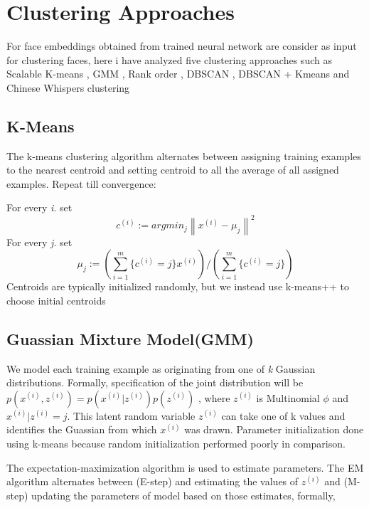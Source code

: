 \documentclass[a4paper,12pt, twoside]{NITKReport}
\begin{document}
\section{Clustering Approaches}
For face embeddings obtained from trained neural network are consider as input for clustering faces, here i have analyzed five clustering approaches such as Scalable K-means \cite{bahmani2012scalable}, GMM \cite{cui2007easyalbum}, Rank order \cite{ho2003clustering}, DBSCAN \cite{schroff2015facenet}, DBSCAN + Kmeans \cite{tian2007face} and Chinese Whispers clustering \cite{biemann2006chinese}

\subsection{K-Means}
\par The k-means clustering algorithm alternates between assigning training examples to the nearest centroid and setting centroid to all the average of all assigned examples. Repeat till convergence:

For every \textit{i}. set
\begin{equation}
c^{(i)} := argmin_{j}\left \| x^{(i)} - \mu _{j} \right \|^{2}
\end{equation}
For every \textit{j}. set
\begin{equation}
\mu _{j} := (\sum_{i=1}^{m} \{ c^{(i)}=j \}x^{(i)})/(\sum_{i=1}^{m} \{ c^{(i)}=j \})
\end{equation}
Centroids are typically initialized randomly, but we instead use k-means++ \cite{bahmani2012scalable} to choose initial centroids

\subsection{Guassian Mixture Model(GMM)}
\par We model each training example as originating from one of \textit{k} Gaussian  distributions. Formally, specification of the joint distribution will be $p(x^{(i)},z^{(i)}) = p(x^{(i)}|z^{(i)})p(z^{(i)})$ , where $z^{(i)}$ is Multinomial $\phi$ and $x^{(i)}|z^{(i)} = j$. This latent random variable $z^{(i)}$ can take one of k values and identifies the Guassian from which $x^{(i)}$ was drawn. Parameter initialization done using k-means because random initialization performed poorly in comparison. 

The expectation-maximization algorithm is used to estimate parameters. The EM algorithm alternates between (E-step) and estimating the values of $z^{(i)}$ and (M-step) updating the parameters of model based on those estimates, formally,
\end{document}
